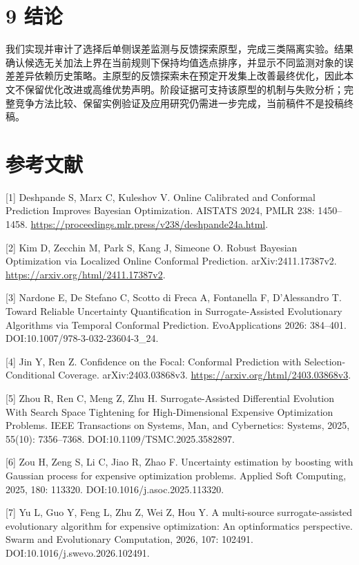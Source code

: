 \documentclass[11pt,a4paper]{article}
\begin{document}
\hypertarget{ux7ed3ux8bba}{%
\section{9 结论}\label{ux7ed3ux8bba}}

我们实现并审计了选择后单侧误差监测与反馈探索原型，完成三类隔离实验。结果确认候选无关加法上界在当前规则下保持均值选点排序，并显示不同监测对象的误差差异依赖历史策略。主原型的反馈探索未在预定开发集上改善最终优化，因此本文不保留优化改进或高维优势声明。阶段证据可支持该原型的机制与失败分析；完整竞争方法比较、保留实例验证及应用研究仍需进一步完成，当前稿件不是投稿终稿。

\hypertarget{ux53c2ux8003ux6587ux732e}{%
\section{参考文献}\label{ux53c2ux8003ux6587ux732e}}

{[}1{]} Deshpande S, Marx C, Kuleshov V. Online Calibrated and Conformal
Prediction Improves Bayesian Optimization. AISTATS 2024, PMLR 238:
1450--1458. \url{https://proceedings.mlr.press/v238/deshpande24a.html}.

{[}2{]} Kim D, Zecchin M, Park S, Kang J, Simeone O. Robust Bayesian
Optimization via Localized Online Conformal Prediction.
arXiv:2411.17387v2. \url{https://arxiv.org/html/2411.17387v2}.

{[}3{]} Nardone E, De Stefano C, Scotto di Freca A, Fontanella F,
D'Alessandro T. Toward Reliable Uncertainty Quantification in
Surrogate-Assisted Evolutionary Algorithms via Temporal Conformal
Prediction. EvoApplications 2026: 384--401.
DOI:10.1007/978-3-032-23604-3\_24.

{[}4{]} Jin Y, Ren Z. Confidence on the Focal: Conformal Prediction with
Selection-Conditional Coverage. arXiv:2403.03868v3.
\url{https://arxiv.org/html/2403.03868v3}.

{[}5{]} Zhou R, Ren C, Meng Z, Zhu H. Surrogate-Assisted Differential
Evolution With Search Space Tightening for High-Dimensional Expensive
Optimization Problems. IEEE Transactions on Systems, Man, and
Cybernetics: Systems, 2025, 55(10): 7356--7368.
DOI:10.1109/TSMC.2025.3582897.

{[}6{]} Zou H, Zeng S, Li C, Jiao R, Zhao F. Uncertainty estimation by
boosting with Gaussian process for expensive optimization problems.
Applied Soft Computing, 2025, 180: 113320.
DOI:10.1016/j.asoc.2025.113320.

{[}7{]} Yu L, Guo Y, Feng L, Zhu Z, Wei Z, Hou Y. A multi-source
surrogate-assisted evolutionary algorithm for expensive optimization: An
optinformatics perspective. Swarm and Evolutionary Computation, 2026,
107: 102491. DOI:10.1016/j.swevo.2026.102491.
\end{document}
